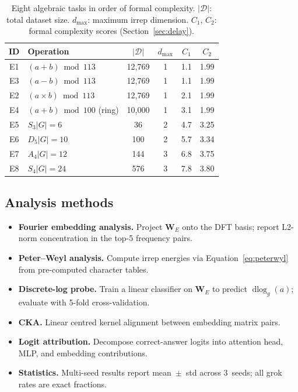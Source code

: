 \documentclass[11pt]{article}
\newcommand{\W}[1]{\mathbf{W}_{#1}}
\newcommand{\dlog}{\operatorname{dlog}}
\begin{document}
\begin{table}[t]
  \centering
  \small
  \caption{Eight algebraic tasks in order of formal complexity.
           $|\mathcal{D}|$: total dataset size.
           $d_{\max}$: maximum irrep dimension.
           $C_1$, $C_2$: formal complexity scores
           (Section~\ref{sec:delay}).}
  \label{tab:tasks}
  \renewcommand{\arraystretch}{1.25}
  \begin{tabular}{@{}clcccc@{}}
    \toprule
    \textbf{ID} & \textbf{Operation} & $|\mathcal{D}|$ &
    $d_{\max}$ & $C_1$ & $C_2$ \\
    \midrule
    E1 & $(a+b)\bmod 113$          & 12,769 & 1 & 1.1 & 1.99 \\
    E3 & $(a-b)\bmod 113$          & 12,769 & 1 & 1.1 & 1.99 \\
    E2 & $(a\times b)\bmod 113$    & 12,769 & 1 & 2.1 & 1.99 \\
    E4 & $(a+b)\bmod 100$ (ring)   & 10,000 & 1 & 3.1 & 1.99 \\
    E5 & $S_3$\quad$|G|=6$         &     36 & 2 & 4.7 & 3.25 \\
    E6 & $D_5$\quad$|G|=10$        &    100 & 2 & 5.7 & 3.34 \\
    E7 & $A_4$\quad$|G|=12$        &    144 & 3 & 6.8 & 3.75 \\
    E8 & $S_4$\quad$|G|=24$        &    576 & 3 & 7.8 & 3.80 \\
    \bottomrule
  \end{tabular}
\end{table}

\subsection{Analysis methods}

\begin{itemize}
  \item \textbf{Fourier embedding analysis.} Project $\W{E}$ onto the
        DFT basis; report L2-norm concentration in the top-5 frequency pairs.
  \item \textbf{Peter--Weyl analysis.} Compute irrep energies via
        Equation~\eqref{eq:peterwyl} from pre-computed character tables.
  \item \textbf{Discrete-log probe.} Train a linear classifier on $\W{E}$
        to predict $\dlog_g(a)$; evaluate with 5-fold cross-validation.
  \item \textbf{CKA.} Linear centred kernel alignment between embedding
        matrix pairs.
  \item \textbf{Logit attribution.} Decompose correct-answer logits into
        attention head, MLP, and embedding contributions.
  \item \textbf{Statistics.} Multi-seed results report mean~$\pm$~std
        across 3~seeds; all grok rates are exact fractions.
\end{itemize}
\end{document}
